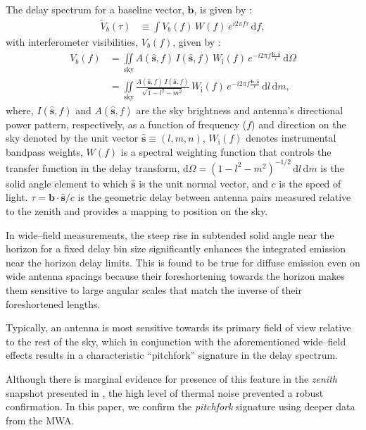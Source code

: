 \documentclass[preprint2,apjl,numberedappendix,twocolappendix,appendixfloats]{emulateapj}
\newcommand{\dif}{\mathrm{d}}
\begin{document}
The delay spectrum for a baseline vector, $\boldsymbol{b}$, is given by \citep{par12a,par12b,thy13,thy15}: 
\begin{align}
  \tilde{V}_b(\tau) &\equiv \int V_b(f)\,W(f)\,e^{i2\pi f\tau}\,\dif f,
\end{align}
with interferometer visibilities, $V_b(f)$, given by \citep{van34,zer38,tho01}:
\begin{align} 
  V_b(f) &= \iint\limits_\textrm{sky} A(\hat{\boldsymbol{s}},f)\,I(\hat{\boldsymbol{s}},f)\,W_\textrm{i}(f)\,e^{-i2\pi f\frac{\boldsymbol{b}\cdot\hat{\boldsymbol{s}}}{c}}\,\dif\Omega \\
         &= \iint\limits_\textrm{sky} \frac{A(\hat{\boldsymbol{s}},f)\,I(\hat{\boldsymbol{s}},f)}{\sqrt{1-l^2-m^2}}\,W_\textrm{i}(f)\,e^{-i2\pi f\frac{\boldsymbol{b}\cdot\hat{\boldsymbol{s}}}{c}}\,\dif l\,\dif m, 
\end{align}
where, $I(\hat{\boldsymbol{s}},f)$ and $A(\hat{\boldsymbol{s}},f)$ are the sky brightness and antenna's directional power pattern, respectively, as a function of frequency ($f$) and direction on the sky denoted by the unit vector $\hat{\boldsymbol{s}}\equiv (l,m,n)$, $W_\textrm{i}(f)$ denotes instrumental bandpass weights, $W(f)$ is a spectral weighting function that controls the transfer function in the delay transform, $\dif\Omega=(1-l^2-m^2)^{-1/2}\,\dif l\,\dif m$ is the solid angle element to which $\hat{\boldsymbol{s}}$ is the unit normal vector, and $c$ is the speed of light. $\tau=\boldsymbol{b}\cdot\hat{\boldsymbol{s}}/c$ is the geometric delay between antenna pairs measured relative to the zenith and provides a mapping to position on the sky.

In wide--field measurements, the steep rise in subtended solid angle near the horizon for a fixed delay bin size significantly enhances the integrated emission near the horizon delay limits. This is found to be true for diffuse emission even on wide antenna spacings because their foreshortening towards the horizon makes them sensitive to large angular scales that match the inverse of their foreshortened lengths. 

Typically, an antenna is most sensitive towards its primary field of view relative to the rest of the sky, which in conjunction with the aforementioned wide--field effects results in a characteristic ``pitchfork'' signature in the delay spectrum. 

Although there is marginal evidence for presence of this feature in the {\it zenith} snapshot presented in \citet{thy15}, the high level of thermal noise prevented a robust confirmation. In this paper, we confirm the {\it pitchfork} signature using deeper data from the MWA.
\end{document}
